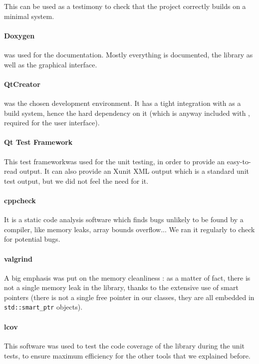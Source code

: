 This can be used as a testimony to check that the project correctly builds on a minimal system.

\paragraph{Doxygen} was used for the documentation. Mostly everything is documented, the library as well as the graphical interface.

\paragraph{QtCreator} was the chosen development environment. It has a tight integration with  as a build system, hence the hard dependency on it (which is anyway included with , required for the user interface). 

\paragraph{Qt Test Framework}
This test frameworkwas used for the unit testing, in order to provide an easy-to-read output. It can also provide an Xunit XML output which is a standard unit test output, but we did not feel the need for it. 

\paragraph{cppcheck}
It is a static code analysis software which finds bugs unlikely to be found by a compiler, like memory leaks, array bounds overflow... We ran it regularly to check for potential bugs.

\paragraph{valgrind}
A big emphasis was put on the memory cleanliness : as a matter of fact, there is not a single memory leak in the library, thanks to the extensive use of smart pointers (there is not a single free pointer in our classes, they are all embedded in \texttt{std::smart\_ptr} objects).

\paragraph{lcov}
This software was used to test the code coverage of the library during the unit tests, to ensure maximum efficiency for the other tools that we explained before.

